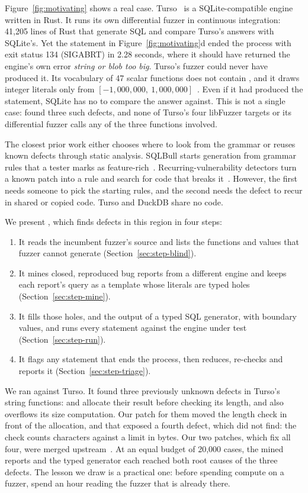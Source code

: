Figure~\ref{fig:motivating} shows a real case. Turso~\cite{turso} is a
SQLite-compatible engine written in Rust. It runs its own differential fuzzer in
continuous integration: 41{,}205 lines of Rust that generate SQL and compare
Turso's answers with SQLite's. Yet the statement in Figure~\ref{fig:motivating}d
ended the process with exit status 134 (SIGABRT) in 2.28 seconds, where it should
have returned the engine's own error \emph{string or blob too big}. Turso's
fuzzer could never have produced it. Its vocabulary of 47 scalar functions does
not contain , and it draws integer literals only from
$[-1{,}000{,}000,\ 1{,}000{,}000]$~\cite{tursofuzzer}. Even if it had produced
the statement, SQLite has no  to compare the answer against. This is
not a single case: \tool found three such defects, and none of
Turso's four libFuzzer targets or its differential fuzzer calls any of the three
functions involved.

The closest prior work either chooses where to look from the grammar or reuses
known defects through static analysis. SQLBull starts generation from grammar
rules that a tester marks as feature-rich~\cite{liang2026sqlbull}.
Recurring-vulnerability detectors turn a known patch into a rule and search for
code that breaks it~\cite{cao2025vulpa,cao2025antman}. However, the first needs
someone to pick the starting rules, and the second needs the defect to recur in
shared or copied code. Turso and DuckDB share no code.

We present \tool, which finds defects in this region in four steps:
\begin{enumerate}
  \item It reads the incumbent fuzzer's source and lists the functions and
        values that fuzzer cannot generate (Section~\ref{sec:step-blind}).
  \item It mines closed, reproduced bug reports from a different engine and keeps
        each report's query as a template whose literals are typed holes
        (Section~\ref{sec:step-mine}).
  \item It fills those holes, and the output of a typed SQL generator, with
        boundary values, and runs every statement against the engine under test
        (Section~\ref{sec:step-run}).
  \item It flags any statement that ends the process, then reduces, re-checks and
        reports it (Section~\ref{sec:step-triage}).
\end{enumerate}

We ran \tool against Turso. It found three previously unknown defects in Turso's
string functions:  and  allocate their result before checking
its length, and  also overflows its size computation. Our patch for
them moved the length check in front of the allocation, and that exposed a
fourth defect, which \tool did not find: the check counts characters against a
limit in bytes. Our two patches, which fix all four, were merged
upstream~\cite{turso11225,turso11259}. At an equal budget of 20{,}000 cases, the
mined reports and the typed generator each reached both root causes of the
three defects. The lesson we draw is a practical one: before spending compute on
a fuzzer, spend an hour reading the fuzzer that is already there.

